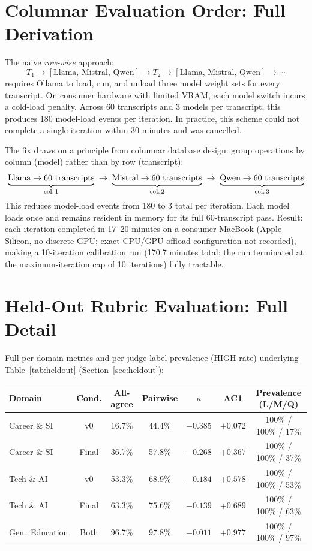\documentclass[11pt]{article}
\begin{document}
\section{Columnar Evaluation Order: Full Derivation}
\label{app:columnar}

The naive \emph{row-wise} approach:
\[
  T_1 \to [\text{Llama, Mistral, Qwen}] \to
  T_2 \to [\text{Llama, Mistral, Qwen}] \to \cdots
\]
requires Ollama to load, run, and unload three model weight sets for every
transcript. On consumer hardware with limited VRAM, each model switch
incurs a cold-load penalty. Across 60 transcripts and 3 models per
transcript, this produces 180 model-load events per iteration. In
practice, this scheme could not complete a single iteration within 30
minutes and was cancelled.

The fix draws on a principle from columnar database design: group
operations by column (model) rather than by row (transcript):
\[
  \underbrace{\text{Llama} \to 60\text{ transcripts}}_{\text{col.\,1}}
  \;\to\;
  \underbrace{\text{Mistral} \to 60\text{ transcripts}}_{\text{col.\,2}}
  \;\to\;
  \underbrace{\text{Qwen} \to 60\text{ transcripts}}_{\text{col.\,3}}
\]
This reduces model-load events from 180 to 3 total per iteration. Each
model loads once and remains resident in memory for its full 60-transcript
pass. Result: each iteration completed in 17--20 minutes on a consumer
MacBook (Apple Silicon, no discrete GPU; exact CPU/GPU offload
configuration not recorded), making a
10-iteration calibration run (170.7 minutes total; the run terminated at
the maximum-iteration cap of 10 iterations) fully tractable.

\section{Held-Out Rubric Evaluation: Full Detail}
\label{app:heldout}

Full per-domain metrics and per-judge label prevalence (HIGH rate)
underlying Table~\ref{tab:heldout} (Section~\ref{sec:heldout}):

\begin{center}
\small
\begin{tabular}{lcccccc}
\toprule
\textbf{Domain} & \textbf{Cond.} & \textbf{All-agree} & \textbf{Pairwise} &
\textbf{$\kappa$} & \textbf{AC1} & \textbf{Prevalence (L/M/Q)} \\
\midrule
Career \& SI       & v0    & 16.7\% & 44.4\% & $-0.385$ & $+0.072$ & 100\% / 100\% / 17\% \\
Career \& SI       & Final & 36.7\% & 57.8\% & $-0.268$ & $+0.367$ & 100\% / 100\% / 37\% \\
Tech \& AI         & v0    & 53.3\% & 68.9\% & $-0.184$ & $+0.578$ & 100\% / 100\% / 53\% \\
Tech \& AI         & Final & 63.3\% & 75.6\% & $-0.139$ & $+0.689$ & 100\% / 100\% / 63\% \\
Gen.\ Education    & Both  & 96.7\% & 97.8\% & $-0.011$ & $+0.977$ & 100\% / 100\% / 97\% \\
\bottomrule
\end{tabular}
\end{center}
\end{document}

